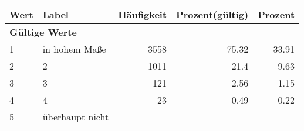      \begin{longtable}{lXrrr}
     \toprule
     \textbf{Wert} & \textbf{Label} & \textbf{Häufigkeit} & \textbf{Prozent(gültig)} & \textbf{Prozent} \\
     \endhead
     \midrule
     \multicolumn{5}{l}{\textbf{Gültige Werte}}\\

     1 &
     \multicolumn{1}{X}{ in hohem Maße   } &


       \num{3558} &
       \num[round-mode=places,round-precision=2]{75.32} &
         \num[round-mode=places,round-precision=2]{33.91} \\

     2 &
     \multicolumn{1}{X}{ 2   } &


       \num{1011} &
       \num[round-mode=places,round-precision=2]{21.4} &
         \num[round-mode=places,round-precision=2]{9.63} \\

     3 &
     \multicolumn{1}{X}{ 3   } &


       \num{121} &
       \num[round-mode=places,round-precision=2]{2.56} &
         \num[round-mode=places,round-precision=2]{1.15} \\

     4 &
     \multicolumn{1}{X}{ 4   } &


       \num{23} &
       \num[round-mode=places,round-precision=2]{0.49} &
         \num[round-mode=places,round-precision=2]{0.22} \\

     5 &
     \multicolumn{1}{X}{ überhaupt nicht   } &



\end{longtable}
